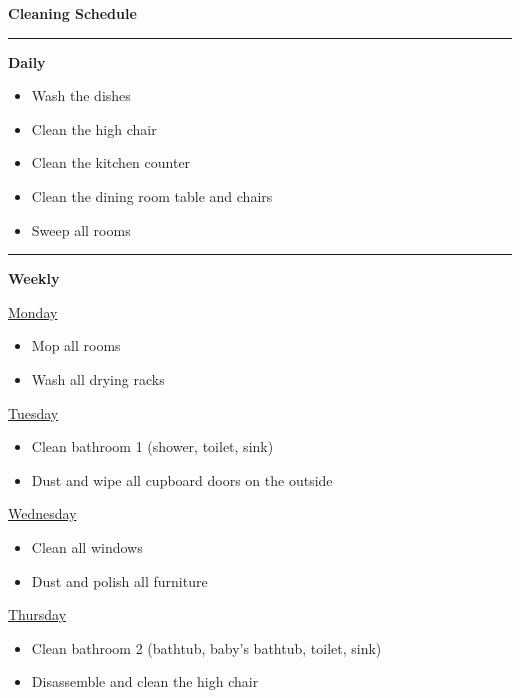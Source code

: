 \documentclass[12pt]{extarticle}
\begin{document}
\begin{center}
  \textsf{\textbf{\Large{}Cleaning Schedule}}
\end{center}

\bigskip

\hrule

\bigskip

\textsf{\textbf{\large{}Daily}}

\begin{itemize}
  \item Wash the dishes
  \item Clean the high chair
  \item Clean the kitchen counter
  \item Clean the dining room table and chairs
  \item Sweep all rooms
\end{itemize}

\hrule

\bigskip

\textsf{\textbf{\large{}Weekly}}

\bigskip

\textsf{\underline{Monday}}

\begin{itemize}
  \item Mop all rooms
  \item Wash all drying racks
\end{itemize}

\textsf{\underline{Tuesday}}

\begin{itemize}
  \item Clean bathroom 1 (shower, toilet, sink)
  \item Dust and wipe all cupboard doors on the outside
\end{itemize}

\textsf{\underline{Wednesday}}

\begin{itemize}
  \item Clean all windows
  \item Dust and polish all furniture
\end{itemize}

\textsf{\underline{Thursday}}

\begin{itemize}
  \item Clean bathroom 2 (bathtub, baby's bathtub, toilet, sink)
  \item Disassemble and clean the high chair
\end{itemize}
\end{document}
